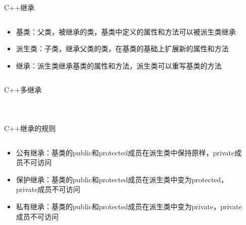 \documentclass[UTF8,aspectratio=169]{beamer}
\begin{document}
\begin{frame}[fragile]{C++继承}
    \begin{columns}
        \begin{column}{0.48\textwidth}
        \begin{itemize}
            \item 基类：父类，被继承的类，基类中定义的属性和方法可以被派生类继承
            \item 派生类：子类，继承父类的类，在基类的基础上扩展新的属性和方法
            \item 继承：派生类继承基类的属性和方法，派生类可以重写基类的方法
        \end{itemize}
        \end{column}
        \begin{column}{0.48\textwidth}
            \inputminted[firstline=1,lastline=16]{cpp}{code/cpp_inherit_example.cpp}
        \end{column}
        \begin{column}{0.48\textwidth}
            \inputminted[firstline=18,lastline=28]{cpp}{code/cpp_inherit_example.cpp}
        \end{column}
    \end{columns}
\end{frame}

\begin{frame}[fragile]{C++多继承}
    \begin{columns}
        \begin{column}{0.48\textwidth}
            \inputminted[firstline=1,lastline=17]{cpp}{code/cpp_multi_inherit_example.cpp}
        \end{column}
        \begin{column}{0.48\textwidth}
            \inputminted[firstline=19,lastline=33]{cpp}{code/cpp_multi_inherit_example.cpp}
        \end{column}
    \end{columns}
\end{frame}

\begin{frame}[fragile]{C++继承的规则}
    \begin{columns}
        \begin{column}{0.48\textwidth}
            \begin{itemize}
                \item 公有继承：基类的public和protected成员在派生类中保持原样，private成员不可访问
                \item 保护继承：基类的public和protected成员在派生类中变为protected，private成员不可访问
                \item 私有继承：基类的public和protected成员在派生类中变为private，private成员不可访问
            \end{itemize}
        \end{column}
        \begin{column}{0.48\textwidth}
            \inputminted[firstline=1,lastline=15]{cpp}{code/cpp_inherit_rule.cpp}
        \end{column}
    \end{columns}
\end{frame}
\end{document}
